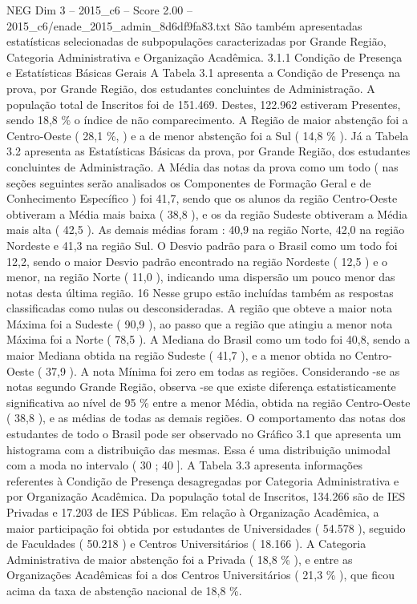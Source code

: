 \begin{textsample}{NEG Dim 3 – 2015\_c6 – Score 2.00 – 2015\_c6/enade\_2015\_admin\_8d6df9fa83.txt}
São também apresentadas estatísticas selecionadas de subpopulações caracterizadas por Grande Região, Categoria Administrativa e Organização Acadêmica. 3.1.1 Condição de Presença e Estatísticas Básicas Gerais A Tabela 3.1 apresenta a Condição de Presença na prova, por Grande Região, dos estudantes concluintes de Administração.
A população total de Inscritos foi de 151.469.
Destes, 122.962 estiveram Presentes, sendo 18,8 \% o índice de não comparecimento.
A Região de maior abstenção foi a Centro-Oeste ( 28,1 \%, ) e a de menor abstenção foi a Sul ( 14,8 \% ).
Já a Tabela 3.2 apresenta as Estatísticas Básicas da prova, por Grande Região, dos estudantes concluintes de Administração.
A Média das notas da prova como um todo ( nas seções seguintes serão analisados os Componentes de Formação Geral e de Conhecimento Específico ) foi 41,7, sendo que os alunos da região Centro-Oeste obtiveram a Média mais baixa ( 38,8 ), e os da região Sudeste obtiveram a Média mais alta ( 42,5 ).
As demais médias foram : 40,9 na região Norte, 42,0 na região Nordeste e 41,3 na região Sul.
O Desvio padrão para o Brasil como um todo foi 12,2, sendo o maior Desvio padrão encontrado na região Nordeste ( 12,5 ) e o menor, na região Norte ( 11,0 ), indicando uma dispersão um pouco menor das notas desta última região. 16 Nesse grupo estão incluídas também as respostas classificadas como nulas ou desconsideradas.
A região que obteve a maior nota Máxima foi a Sudeste ( 90,9 ), ao passo que a região que atingiu a menor nota Máxima foi a Norte ( 78,5 ).
A Mediana do Brasil como um todo foi 40,8, sendo a maior Mediana obtida na região Sudeste ( 41,7 ), e a menor obtida no Centro-Oeste ( 37,9 ).
A nota Mínima foi zero em todas as regiões.
Considerando -se as notas segundo Grande Região, observa -se que existe diferença estatisticamente significativa ao nível de 95 \% entre a menor Média, obtida na região Centro-Oeste ( 38,8 ), e as médias de todas as demais regiões.
O comportamento das notas dos estudantes de todo o Brasil pode ser observado no Gráfico 3.1 que apresenta um histograma com a distribuição das mesmas.
Essa é uma distribuição unimodal com a moda no intervalo ( 30 ; 40 ].
A Tabela 3.3 apresenta informações referentes à Condição de Presença desagregadas por Categoria Administrativa e por Organização Acadêmica.
Da população total de Inscritos, 134.266 são de IES Privadas e 17.203 de IES Públicas.
Em relação à Organização Acadêmica, a maior participação foi obtida por estudantes de Universidades ( 54.578 ), seguido de Faculdades ( 50.218 ) e Centros Universitários ( 18.166 ).
A Categoria Administrativa de maior abstenção foi a Privada ( 18,8 \% ), e entre as Organizações Acadêmicas foi a dos Centros Universitários ( 21,3 \% ), que ficou acima da taxa de abstenção nacional de 18,8 \%.

\end{textsample}
